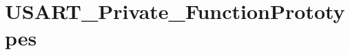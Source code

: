 \hypertarget{group___u_s_a_r_t___private___function_prototypes}{\section{U\-S\-A\-R\-T\-\_\-\-Private\-\_\-\-Function\-Prototypes}
\label{group___u_s_a_r_t___private___function_prototypes}
}
